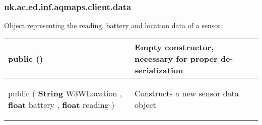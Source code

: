 \subsubsection*{ uk.ac.ed.inf.aqmaps.client.data }
 {\scriptsize Object representing the reading, battery and location data of a sensor
 
\vspace*{-5pt} 
\begin{tabularx}{\linewidth}{X|m{}}
\label{tab:SensorData}
\begin{raggedleft}public  \textbf{\hyperref[tab:SensorData]{\color{blue}{SensorData}}}()
\end{raggedleft} &
 Empty constructor, necessary for proper de{-}serialization\\ \hline 
\begin{raggedleft}public  \textbf{\hyperref[tab:SensorData]{\color{blue}{SensorData}} }(\newline \hfill 
\hspace*{ 5pt} \textbf{String} W3WLocation , \newline
 \hspace*{ 5pt} \textbf{float} battery , \newline
 \hspace*{ 5pt} \textbf{float} reading  )
\end{raggedleft} &
 Constructs a new sensor data object\\\end{tabularx}
}
